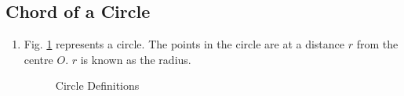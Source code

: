 \subsection{Chord of a Circle}
%
\renewcommand{\theequation}{\theenumi}
\begin{enumerate}[label=\arabic*.,ref=\thesubsection.\theenumi]
%
\item
	Fig. \ref{ch4_circle_def} represents a circle.  The points in the circle are at a distance $r$ from the centre $O$.  $r$ is known as the radius.

\begin{figure}[!ht]
	\begin{center}
		
		\resizebox{\columnwidth}{!}{}
	\end{center}
	\caption{Circle Definitions}
	\label{ch4_circle_def}	
\end{figure}
\end{enumerate}
